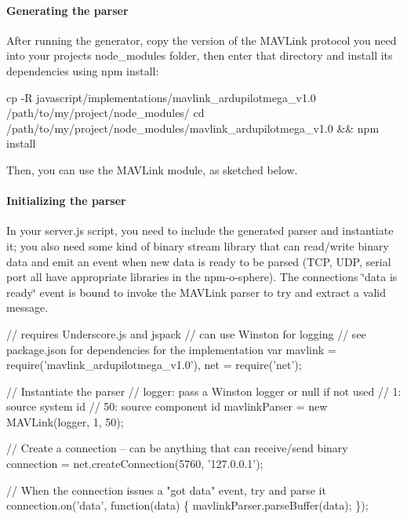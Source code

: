 \paragraph*{Generating the parser}

After running the generator, copy the version of the M\+A\+V\+Link protocol you need into your project\textquotesingle{}s {\ttfamily node\+\_\+modules} folder, then enter that directory and install its dependencies using {\ttfamily npm install}\+:


\begin{DoxyCode}
cp -R javascript/implementations/mavlink\_ardupilotmega\_v1.0 /path/to/my/project/node\_modules/
cd /path/to/my/project/node\_modules/mavlink\_ardupilotmega\_v1.0 && npm install
\end{DoxyCode}


Then, you can use the M\+A\+V\+Link module, as sketched below.

\paragraph*{Initializing the parser}

In your {\ttfamily server.\+js} script, you need to include the generated parser and instantiate it; you also need some kind of binary stream library that can read/write binary data and emit an event when new data is ready to be parsed (T\+CP, U\+DP, serial port all have appropriate libraries in the npm-\/o-\/sphere). The connection\textquotesingle{}s \char`\"{}data is ready\char`\"{} event is bound to invoke the M\+A\+V\+Link parser to try and extract a valid message.


\begin{DoxyCode}
// requires Underscore.js and jspack
// can use Winston for logging
// see package.json for dependencies for the implementation
var mavlink = require('mavlink\_ardupilotmega\_v1.0'), 
    net = require('net');

// Instantiate the parser
// logger: pass a Winston logger or null if not used
// 1: source system id
// 50: source component id
mavlinkParser = new MAVLink(logger, 1, 50);

// Create a connection -- can be anything that can receive/send binary
connection = net.createConnection(5760, '127.0.0.1');

// When the connection issues a "got data" event, try and parse it
connection.on('data', function(data) \{
    mavlinkParser.parseBuffer(data);
\});
\end{DoxyCode}


